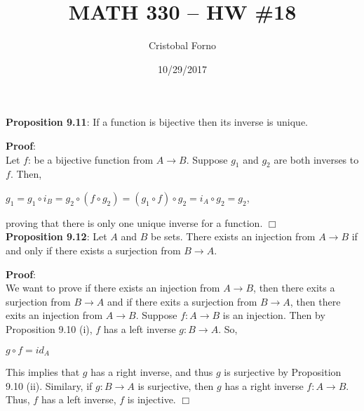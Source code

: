 \documentclass[12pt]{article}
\title{MATH 330 -- HW \#18}
\author{Cristobal Forno}
\date{10/29/2017}
\begin{document}
\maketitle

\noindent
\textbf{Proposition 9.11}: If a function is bijective then its inverse is unique.

\noindent
\textbf{Proof}:\\
Let $f$: be a bijective function from  $A \to B$.
Suppose $g_1$ and $g_2$ are both inverses to $f$. Then,
\begin{center}
$ g_1 = g_1 \circ i_B = g_2 \circ (f \circ g_2) = (g_1 \circ f) \circ
g_2 = i_A \circ g_2 = g_2 $,
\end{center}
\noindent
proving that there is only one unique inverse for a function. $\Box$ \\

\noindent
\textbf{Proposition 9.12}: Let $A$ and $B$ be sets. There exists an injection
from $A \to B$ if and only if there exists a surjection from $B \to A$.

\noindent
\textbf{Proof}:\\
We want to prove if there exists an injection from $A \to B$, then there exits a
surjection from $B \to A$ and if there exits a surjection from $B \to A$,
then there exits an injection from $A \to B$. Suppose $f:A \to B$ is an
injection. Then by Proposition 9.10 (i), $f$ has a left inverse $g: B \to A$. So,
\begin{center}
$g \circ f = id_A$
\end{center}
This implies that $g$ has a right inverse, and thus $g$ is surjective by
Proposition 9.10 (ii). Similary, if $g: B \to A$ is surjective, then $g$ has a
right inverse $f: A \to B$. Thus, $f$ has a left inverse, $f$ is injective. $\Box$
\end{document}
